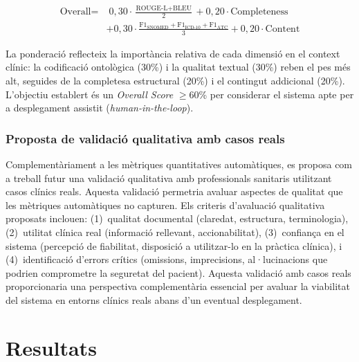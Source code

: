 \documentclass[CAT]{TFUOC}%
\begin{document}
\begin{equation*}
\begin{split}
\text{Overall} = & \; 0{,}30 \cdot \frac{\text{ROUGE-L}+\text{BLEU}}{2} + 0{,}20 \cdot \text{Completeness} \\
& + 0{,}30 \cdot \frac{\text{F1}_\text{SNOMED}+\text{F1}_\text{ICD-10}+\text{F1}_\text{ATC}}{3} + 0{,}20 \cdot \text{Content}
\end{split}
\end{equation*}

La ponderació reflecteix la importància relativa de cada dimensió en el context clínic: la codificació ontològica (30\%) i la qualitat textual (30\%) reben el pes més alt, seguides de la completesa estructural (20\%) i el contingut addicional (20\%). L'objectiu establert és un \textit{Overall Score} $\geq$60\% per considerar el sistema apte per a desplegament assistit (\textit{human-in-the-loop}).

\subsection{Proposta de validació qualitativa amb casos reals}

Complementàriament a les mètriques quantitatives automàtiques, es proposa com a treball futur una validació qualitativa amb professionals sanitaris utilitzant casos clínics reals. Aquesta validació permetria avaluar aspectes de qualitat que les mètriques automàtiques no capturen. Els criteris d'avaluació qualitativa proposats inclouen: (1)~qualitat documental (claredat, estructura, terminologia), (2)~utilitat clínica real (informació rellevant, accionabilitat), (3)~confiança en el sistema (percepció de fiabilitat, disposició a utilitzar-lo en la pràctica clínica), i (4)~identificació d'errors crítics (omissions, imprecisions, al·lucinacions que podrien comprometre la seguretat del pacient). Aquesta validació amb casos reals proporcionaria una perspectiva complementària essencial per avaluar la viabilitat del sistema en entorns clínics reals abans d'un eventual desplegament.


\chapter{Resultats}
\end{document}
